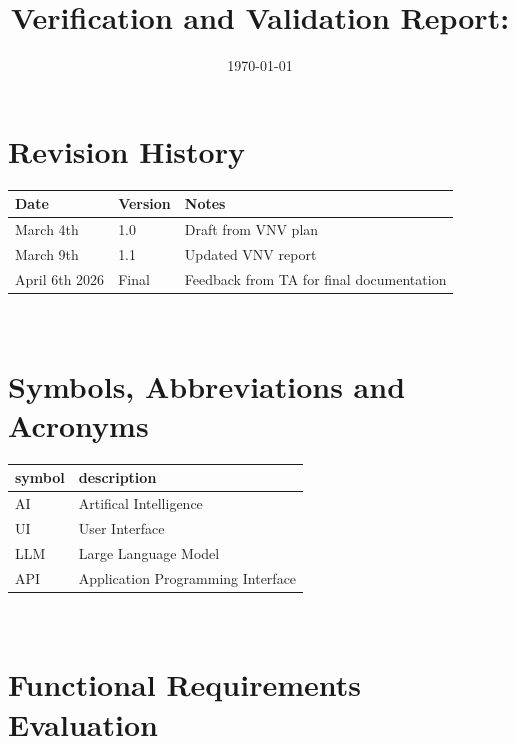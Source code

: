 \documentclass[12pt, titlepage]{article}
\begin{document}
\title{Verification and Validation Report: \progname} 
\author{\authname}
\date{\today}
	
\maketitle


\section{Revision History}

\begin{tabularx}{\textwidth}{p{3cm}p{2cm}X}
\toprule {\bf Date} & {\bf Version} & {\bf Notes}\\
\midrule
March 4th & 1.0 & Draft from VNV plan\\
March 9th & 1.1 & Updated VNV report\\
April 6th 2026 & Final & Feedback from TA for final documentation\\
\bottomrule
\end{tabularx}

~\newpage

\section{Symbols, Abbreviations and Acronyms}

\renewcommand{\arraystretch}{1.2}
\begin{tabular}{l l} 
  \toprule		
  \textbf{symbol} & \textbf{description}\\
  \midrule 
  AI & Artifical Intelligence\\
  UI & User Interface \\
  LLM & Large Language Model \\
  API & Application Programming Interface \\
  
  \bottomrule
\end{tabular}\\

\newpage

\tableofcontents

\listoftables %

\listoffigures %

\newpage


\section{Functional Requirements Evaluation}
\end{document}
